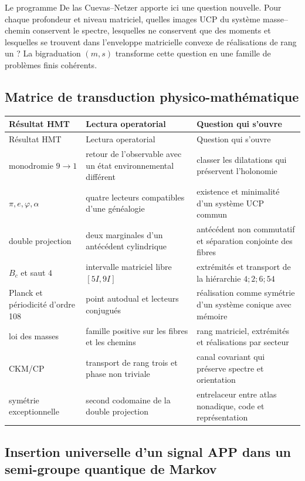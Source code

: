Le programme De las Cuevas--Netzer apporte ici une question nouvelle. Pour chaque
profondeur et niveau matriciel, quelles images UCP du système masse--chemin
conservent le spectre, lesquelles ne conservent que des moments et lesquelles se trouvent
dans l'enveloppe matricielle convexe de réalisations de rang un ? La
bigraduation $(m,s)$ transforme cette question en une famille de problèmes
finis cohérents.

\subsection{Matrice de transduction physico-mathématique}

\begin{longtable}{@{}L{.23\textwidth}L{.31\textwidth}L{.36\textwidth}@{}}
\toprule
Résultat HMT & Lectura operatorial & Question qui s'ouvre\\
\midrule
\endfirsthead
\toprule
Résultat HMT & Lectura operatorial & Question qui s'ouvre\\
\midrule
\endhead
monodromie $9\to1$ & retour de l'observable avec un état environnemental différent &
classer les dilatations qui préservent l'holonomie\\
$\pi,e,\varphi,\alpha$ & quatre lecteurs compatibles d'une généalogie &
existence et minimalité d'un système UCP commun\\
double projection & deux marginales d'un antécédent cylindrique &
antécédent non commutatif et séparation conjointe des fibres\\
$B_c$ et saut $4$ & intervalle matriciel libre $[5I,9I]$ &
extrémités et transport de la hiérarchie $4;2;6;54$\\
Planck et périodicité d'ordre 108 & point autodual et lecteurs conjugués &
réalisation comme symétrie d'un système conique avec mémoire\\
loi des masses & famille positive sur les fibres et les chemins &
rang matriciel, extrémités et réalisations par secteur\\
CKM/CP & transport de rang trois et phase non triviale &
canal covariant qui préserve spectre et orientation\\
symétrie exceptionnelle & second codomaine de la double projection &
entrelaceur entre atlas nonadique, code et représentation\\
\bottomrule
\end{longtable}

\subsection{Insertion universelle d'un signal APP dans un semi-groupe quantique de Markov}

